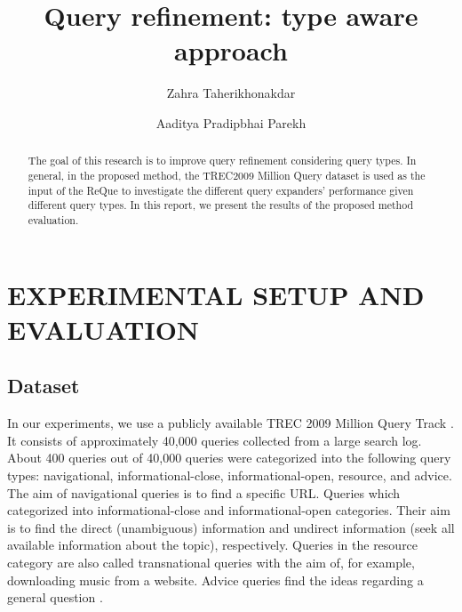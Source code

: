 \documentclass[sigconf]{acmart}
\begin{document}
\title{Query refinement: type aware approach}
\author{Zahra Taherikhonakdar}
\author{Aaditya Pradipbhai Parekh}

\begin{abstract}
The goal of this research is to improve query refinement considering query types. In general, in the proposed method, the TREC2009 Million Query dataset \cite{WinNT} is used as the input of the ReQue \cite{tamannaee2020reque} to investigate the different query expanders' performance given different query types. In this report, we present the results of the proposed method evaluation.
\end{abstract}

\maketitle


\section{EXPERIMENTAL SETUP AND EVALUATION}
\subsection{Dataset}
In our experiments, we use a publicly available TREC 2009 Million Query Track \cite{WinNT}. It consists of approximately 40,000 queries collected from a large search log. About 400 queries out of 40,000 queries were categorized into the following query types: navigational, informational-close, informational-open, resource, and advice. The aim of navigational queries is to find a specific URL. Queries which categorized into informational-close and informational-open categories. Their aim is to find the direct (unambiguous) information and undirect information (seek all available information about the topic), respectively. Queries in the resource category are also called transnational queries with the aim of, for example, downloading music from a website. Advice queries find the ideas regarding a general question \cite{carterette2009million}. 
\end{document}
